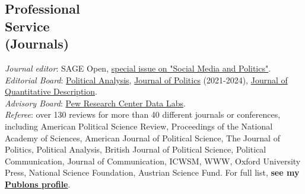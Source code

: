 \documentclass[margin,line,11pt]{resume}
\newcommand{\nl}{\vspace{0.10in}\\}
\begin{document}
\begin{resume}

    
   
    


\section{\mysidestyle Professional\\Service\\(Journals)}

\emph{Journal editor}: SAGE Open, \href{https://journals.sagepub.com/topic/sgo-subjects/3468/sgo}{special issue on "Social Media and Politics"}.\nl
\emph{Editorial Board}: \href{https://www.cambridge.org/core/journals/political-analysis/information/editorial-board}{Political Analysis}, \href{https://www.journals.uchicago.edu/journals/jop/board}{Journal of Politics} (2021-2024), \href{https://journalqd.org/editorialboard}{Journal of Quantitative Description}.\nl
\emph{Advisory Board}: \href{https://www.pewresearch.org/methods/about-data-labs/}{Pew Research Center Data Labs}.\nl
\emph{Referee}: over 130 reviews for more than 40 different journals or conferences, including American Political Science Review, Proceedings of the National Academy of Sciences, American Journal of Political Science, The Journal of Politics, Political Analysis, British Journal of Political Science, Political Communication, Journal of Communication, ICWSM, WWW, Oxford University Press, National Science Foundation, Austrian Science Fund. For full list, \textbf{see my \href{https://publons.com/author/1291880/pablo-barbera}{Publons profile}}.


\end{resume}
\end{document}
